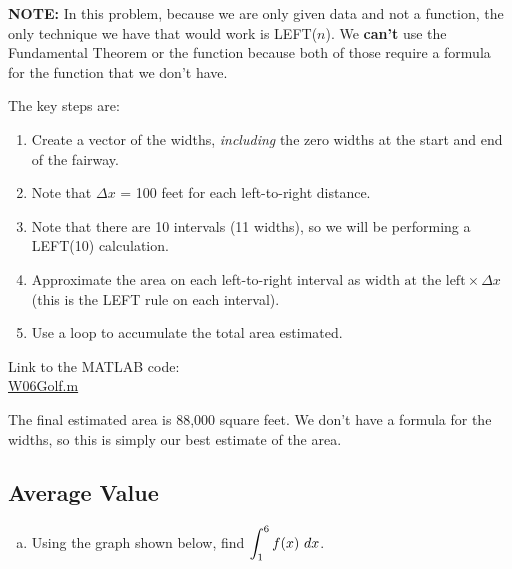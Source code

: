 \begin{enumerate}[1.]
  
\begin{Solution}
  {\bf NOTE: } In this problem, because we are only given data and not
  a function, the only technique we have that would work is LEFT($n$).
  We {\bf can't} use the Fundamental Theorem or the \verb@integral@
  function because both of those require a formula for the function
  that we don't have.

The key steps are:
\begin{enumerate}[1.]
\item Create a vector of the widths, {\em including} the zero widths
  at the start and end of the fairway.
\item Note that  $\Delta x$ = 100 feet for each left-to-right distance.
\item Note that there are 10 intervals (11 widths), so we will be performing a LEFT(10) calculation.
\item Approximate the area on each left-to-right interval as
  $\mbox{width at the left} \times \Delta x$ (this is the LEFT rule on
  each interval).
\item Use a loop to accumulate the total area estimated.
\end{enumerate}

Link to the MATLAB code: \\
\href{http://www.mast.queensu.ca/~apsc171/MNTCP01/PracticeProblems/MATLAB/W06Golf.m}{W06Golf.m}

The final estimated area is 88,000 square feet.  We don't have a
formula for the widths, so this is simply our best estimate of the
area.

\end{Solution}


\hrulefill

\subsection*{Average Value}

\begin{multicols}{2}
\item
  \begin{Question}
    \begin{enumerate}[(a)]
    \item Using the graph shown below, find $\displaystyle \int^6_1 f(x)~dx$. 


\end{enumerate}
\end{Question}
\end{multicols}
\end{enumerate}

